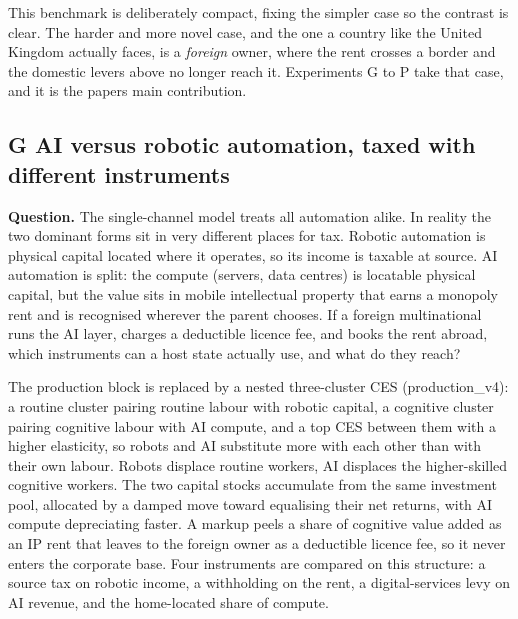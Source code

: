 \documentclass[12pt]{article}
\begin{document}
This benchmark is deliberately compact, fixing the simpler case so the
contrast is clear. The harder and more novel case, and the one a country
like the United Kingdom actually faces, is a \emph{foreign} owner, where
the rent crosses a border and the domestic levers above no longer reach
it. Experiments G to P take that case, and it is the
paper\textquotesingle s main contribution.

\hypertarget{g-ai-versus-robotic-automation-taxed-with-different-instruments}{%
\subsection{G \textperiodcentered{} AI versus robotic automation, taxed with different
instruments}\label{g-ai-versus-robotic-automation-taxed-with-different-instruments}}

\textbf{Question.} The single-channel model treats all automation alike.
In reality the two dominant forms sit in very different places for tax.
Robotic automation is physical capital located where it operates, so its
income is taxable at source. AI automation is split: the compute
(servers, data centres) is locatable physical capital, but the value
sits in mobile intellectual property that earns a monopoly rent and is
recognised wherever the parent chooses. If a foreign multinational runs
the AI layer, charges a deductible licence fee, and books the rent
abroad, which instruments can a host state actually use, and what do
they reach?

The production block is replaced by a nested three-cluster CES
(production\_v4): a routine cluster pairing routine labour with robotic
capital, a cognitive cluster pairing cognitive labour with AI compute,
and a top CES between them with a higher elasticity, so robots and AI
substitute more with each other than with their own labour. Robots
displace routine workers, AI displaces the higher-skilled cognitive
workers. The two capital stocks accumulate from the same investment
pool, allocated by a damped move toward equalising their net returns,
with AI compute depreciating faster. A markup peels a share of cognitive
value added as an IP rent that leaves to the foreign owner as a
deductible licence fee, so it never enters the corporate base. Four
instruments are compared on this structure: a source tax on robotic
income, a withholding on the rent, a digital-services levy on AI
revenue, and the home-located share of compute.
\end{document}
